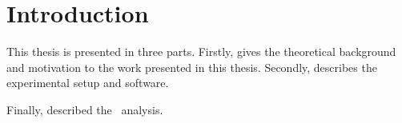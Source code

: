 \graphicspath{{Chapters/Introduction/Figures/}}

\chapter*{Introduction}
\label{chap:Introduction}

This thesis is presented in three parts. Firstly,  gives the theoretical background
and motivation to the work presented in this thesis.
Secondly,  describes the experimental setup and software.

Finally,  described the \ZZ\ analysis.


